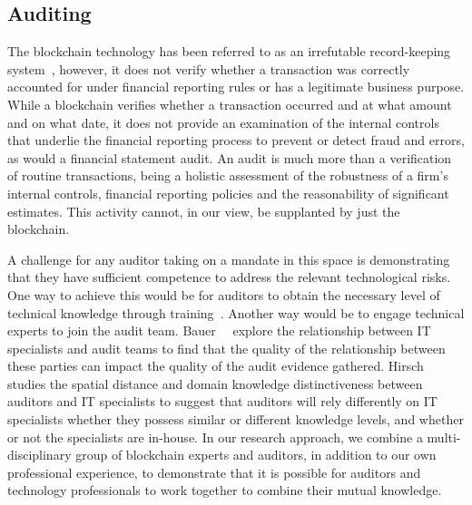 \subsection{Auditing}
The blockchain technology has been referred to as an irrefutable record-keeping system~\cite{crosby2016blockchain}, however, it does not verify whether a transaction was correctly accounted for under financial reporting rules or has a legitimate business purpose. While a blockchain verifies whether a transaction occurred and at what amount and on what date, it does not provide an examination of the internal controls that underlie the financial reporting process to prevent or detect fraud and errors, as would a financial statement audit. An audit is much more than a verification of routine transactions, being a holistic assessment of the robustness of a firm's internal controls, financial reporting policies and the reasonability of significant estimates. This activity cannot, in our view, be supplanted by just the blockchain.

A challenge for any auditor taking on a mandate in this space is demonstrating that they have sufficient competence to address the relevant technological risks. One way to achieve this would be for auditors to obtain the necessary level of technical knowledge through training~\cite{curtis2009auditors}. Another way would be to engage technical experts to join the audit team. Bauer~\etal~\cite{bauer2019one} explore the relationship between IT specialists and audit teams to find that the quality of the relationship between these parties can impact the quality of the audit evidence gathered. Hirsch~\cite{hirsch2020effect} studies the spatial distance and domain knowledge distinctiveness between auditors and IT specialists to suggest that auditors will rely differently on IT specialists whether they possess similar or different knowledge levels, and whether or not the specialists are in-house. In our research approach, we combine a multi-disciplinary group of blockchain experts and auditors, in addition to our own professional experience, to demonstrate that it is possible for auditors and technology professionals to work together to combine their mutual knowledge.


